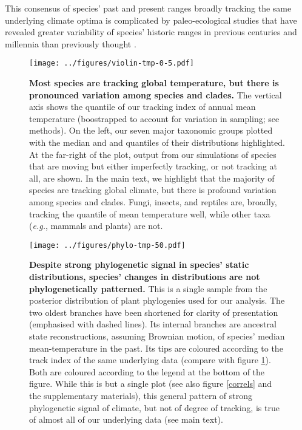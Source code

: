 \documentclass[12pt]{report}
\begin{document}
This consensus of species' past and present ranges broadly tracking
the same underlying climate optima is complicated by paleo-ecological
studies that have revealed greater variability of species' historic
ranges in previous centuries and millennia than previously thought
\supercite{Williams2007,Veloz2012,Maguire2015}.

\clearpage
\clearpage
\begin{figure}[h!]
  \begin{center}
    \texttt{[image: ../figures/violin-tmp-0-5.pdf]}
  \end{center}
  \caption{\doublespacing \textbf{Most species are tracking global
      temperature, but there is pronounced variation among species and
      clades.} The vertical axis shows the  quantile of our
    tracking index of annual mean temperature (boostrapped to account
    for variation in sampling; see methods). On the left, our seven
    major taxonomic groups plotted with the median and  and
     quantiles of their distributions highlighted. At the
    far-right of the plot, output from our simulations of species that
    are moving but either imperfectly tracking, or not tracking at
    all, are shown. In the main text, we highlight that the majority
    of species are tracking global climate, but there is profound
    variation among species and clades. Fungi, insects, and reptiles
    are, broadly, tracking the  quantile of mean temperature
    well, while other taxa (\emph{e.g.}, mammals and plants) are not.}
  \label{violin}
\end{figure}

\clearpage
\begin{landscape}
\begin{figure}[h!]
  \begin{center}
    \texttt{[image: ../figures/phylo-tmp-50.pdf]}
  \end{center}
  \caption{\doublespacing \textbf{Despite strong phylogenetic signal
      in species' static distributions, species' changes in
      distributions are not phylogenetically patterned.} This is a
    single sample from the posterior distribution of plant phylogenies
    used for our analysis\supercite{Smith2018}. The two oldest
    branches have been shortened for clarity of presentation
    (emphasised with dashed lines). Its internal branches are
    ancestral state reconstructions, assuming Brownian motion, of
    species' median mean-temperature in the past. Its tips are
    coloured according to the track index of the same underlying data
    (compare with figure \ref{violin}). Both are coloured according to
    the legend at the bottom of the figure. While this is but a single
    plot (see also figure \ref{correls} and the supplementary
    materials), this general pattern of strong phylogenetic signal of
    climate, but not of degree of tracking, is true of almost all of
    our underlying data (see main text).}
  \label{pca}
\end{figure}
\end{landscape}
\end{document}
